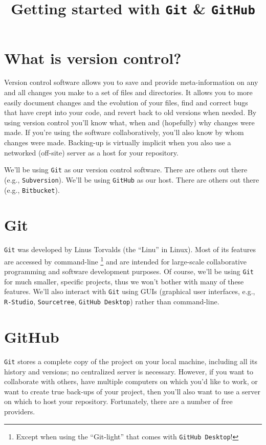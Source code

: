 \documentclass[12pt,letterpaper]{article}
\author{}
\title{Getting started with \texttt{Git} \& \texttt{GitHub}}
\date{}
\begin{document}
\maketitle

\tableofcontents

\pagebreak


\section{What is version control?}
Version control software allows you to save and provide meta-information on any and all changes you make to a set of files and directories.
It allows you to more easily document changes and the evolution of your files, 
find and correct bugs that have crept into your code, 
and revert back to old versions when needed.
By using version control you'll know what, 
when and (hopefully) why changes were made.
If you're using the software collaboratively, 
you'll also know by whom changes were made.
Backing-up is virtually implicit when you also use a networked (off-site) server as a host for your repository.

We'll be using \texttt{Git} as our version control software.
There are others out there (e.g., \texttt{Subversion}).
We'll be using \texttt{GitHub} as our host.
There are others out there (e.g., \texttt{Bitbucket}).

\section{Git}
\texttt{Git} was developed by Linus Torvalds (the ``Linu'' in Linux).
Most of its features are accessed by command-line
\unskip
\footnote{
	Except when using the ``Git-light'' that comes with \texttt{GitHub Desktop}!}
and are intended for large-scale collaborative programming and software development purposes.
Of course, we'll be using \texttt{Git} for much smaller, specific projects, thus we 
won't bother with many of these features.
We'll also interact with \texttt{Git} using GUIs (graphical user interfaces, e.g., \texttt{R-Studio}, \texttt{Sourcetree}, \texttt{GitHub Desktop}) rather than command-line.


\section{GitHub}
\texttt{Git} stores a complete copy of the project on your local machine, 
including all its history and versions; 
no centralized server is necessary.
However, if you want to collaborate with others, 
have multiple computers on which you'd like to work, 
or want to create true back-ups of your project, 
then you'll also want to use a server on which to host your repository.
Fortunately, there are a number of free providers.
\end{document}
